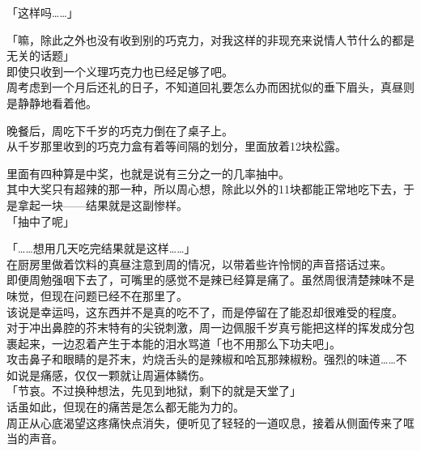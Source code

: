 「这样吗……」

「嘛，除此之外也没有收到别的巧克力，对我这样的非现充来说情人节什么的都是无关的话题」\\

即使只收到一个义理巧克力也已经足够了吧。\\

周考虑到一个月后还礼的日子，不知道回礼要怎么办而困扰似的垂下眉头，真昼则是静静地看着他。\\

\vspace{2\baselineskip}

晚餐后，周吃下千岁的巧克力倒在了桌子上。\\

从千岁那里收到的巧克力盒有着等间隔的划分，里面放着12块松露。

里面有四种算是中奖，也就是说有三分之一的几率抽中。\\

其中大奖只有超辣的那一种，所以周心想，除此以外的11块都能正常地吃下去，于是拿起一块——结果就是这副惨样。\\

「抽中了呢」

「……想用几天吃完结果就是这样……」\\

在厨房里做着饮料的真昼注意到周的情况，以带着些许怜悯的声音搭话过来。\\

即便周勉强咽下去了，可嘴里的感觉不是辣已经算是痛了。虽然周很清楚辣味不是味觉，但现在问题已经不在那里了。\\

该说是幸运吗，这东西并不是真的吃不了，而是停留在了能忍却很难受的程度。\\

对于冲出鼻腔的芥末特有的尖锐刺激，周一边佩服千岁真亏能把这样的挥发成分包裹起来，一边忍着产生于本能的泪水骂道「也不用那么下功夫吧」。\\

攻击鼻子和眼睛的是芥末，灼烧舌头的是辣椒和哈瓦那辣椒粉。强烈的味道……不如说是痛感，仅仅一颗就让周遍体鳞伤。\\

「节哀。不过换种想法，先见到地狱，剩下的就是天堂了」\\

话虽如此，但现在的痛苦是怎么都无能为力的。\\

周正从心底渴望这疼痛快点消失，便听见了轻轻的一道叹息，接着从侧面传来了哐当的声音。\\

